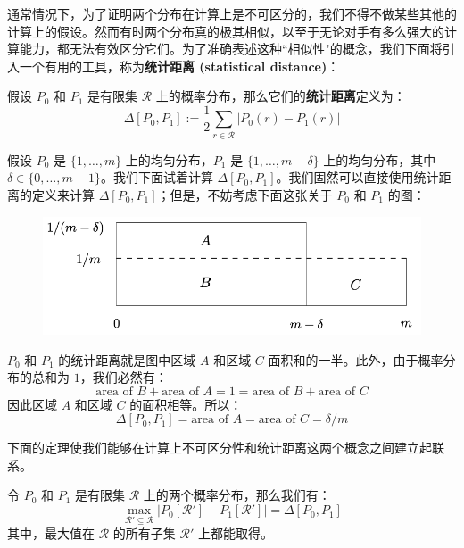 通常情况下，为了证明两个分布在计算上是不可区分的，我们不得不做某些其他的计算上的假设。然而有时两个分布真的极其相似，以至于无论对手有多么强大的计算能力，都无法有效区分它们。为了准确表述这种``相似性"的概念，我们下面将引入一个有用的工具，称为\textbf{统计距离 (statistical distance)}：

\begin{definition}[统计距离]\label{def:3-5}
假设 $P_0$ 和 $P_1$ 是有限集 $\mathcal R$ 上的概率分布，那么它们的\textbf{统计距离}定义为：
\[
\Delta[P_0,P_1]:=\frac{1}{2}\sum_{r\in\mathcal{R}}\big\lvert P_0(r)-P_1(r)\big\rvert
\]
\end{definition}

\begin{example}\label{exmp:3-1}
假设 $P_0$ 是 $\{1,\dots,m\}$ 上的均匀分布，$P_1$ 是 $\{1,\dots,m-\delta\}$ 上的均匀分布，其中 $\delta\in\{0,\dots,m-1\}$。我们下面试着计算 $\Delta[P_0,P_1]$。我们固然可以直接使用统计距离的定义来计算 $\Delta[P_0,P_1]$；但是，不妨考虑下面这张关于 $P_0$ 和 $P_1$ 的图：

\begin{figure}[h!]
  \centering
  \includegraphics[width=0.55\linewidth]{figures/chapter3/fig-vac1.png}
\end{figure}

$P_0$ 和 $P_1$ 的统计距离就是图中区域 $A$ 和区域 $C$ 面积和的一半。此外，由于概率分布的总和为 $1$，我们必然有：
\[
\text{area of } B+ \text{area of } A= 1 = \text{area of } B+ \text{area of } C
\]
因此区域 $A$ 和区域 $C$ 的面积相等。所以：
\[
\Delta[P_0,P_1]=\text{area of } A = \text{area of } C ={\delta}/{m}
\]
\end{example}

下面的定理使我们能够在计算上不可区分性和统计距离这两个概念之间建立起联系。

\begin{theorem}\label{theo:3-10}
令 $P_0$ 和 $P_1$ 是有限集 $\mathcal R$ 上的两个概率分布，那么我们有：
\[
\max_{\mathcal{R}'\subseteq\mathcal{R}}|P_0[\mathcal{R}']-P_1[\mathcal{R}']|=\Delta[P_0,P_1]
\]
其中，最大值在 $\mathcal R$ 的所有子集 $\mathcal R'$ 上都能取得。
\end{theorem}

